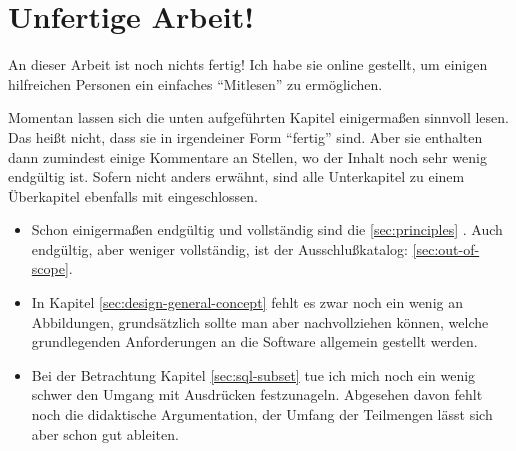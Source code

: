 \documentclass[paper=a4,fontsize=12pt,parskip=half]{scrartcl}
\title{\doctitle}
\subtitle{\docsubtitle}
\author{\docauthors}
\date{\today{}}
\begin{document}

\newpage{}

\section*{Unfertige Arbeit!}

An dieser Arbeit ist noch nichts fertig! Ich habe sie online gestellt, um einigen hilfreichen Personen ein einfaches ``Mitlesen'' zu ermöglichen.

Momentan lassen sich die unten aufgeführten Kapitel einigermaßen sinnvoll lesen. Das heißt nicht, dass sie in irgendeiner Form ``fertig'' sind. Aber sie enthalten dann zumindest einige Kommentare an Stellen, wo der Inhalt noch sehr wenig endgültig ist. Sofern nicht anders erwähnt, sind alle Unterkapitel zu einem Überkapitel ebenfalls mit eingeschlossen.

\begin{itemize}
  \item Schon einigermaßen endgültig und vollständig sind die \ref{sec:principles} . Auch endgültig, aber weniger vollständig, ist der Ausschlußkatalog: \ref{sec:out-of-scope}. 
  \item In Kapitel \ref{sec:design-general-concept}  fehlt es zwar noch ein wenig an Abbildungen, grundsätzlich sollte man aber nachvollziehen können, welche grundlegenden Anforderungen an die Software allgemein gestellt werden.
  \item Bei der Betrachtung Kapitel \ref{sec:sql-subset}  tue ich mich noch ein wenig schwer den Umgang mit Ausdrücken festzunageln. Abgesehen davon fehlt noch die didaktische Argumentation, der Umfang der Teilmengen lässt sich aber schon gut ableiten.
\end{itemize}

\tableofcontents{}
\newpage{}









\appendix{}





\listoftodos[Notes]

\printbibliography
\end{document}
